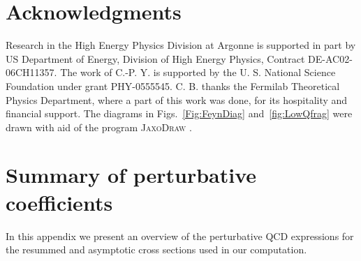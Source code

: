 \documentclass[12pt,english,aps,preprint,prd,letterpaper,fleqn,nofootinbib,showpacs,showkeys,tightenlines,floatfix]{revtex4}
\begin{document}
{\section*{Acknowledgments}

Research in the High Energy Physics Division at Argonne is supported
in part by US Department of Energy, Division of High Energy Physics,
Contract DE-AC02-06CH11357. The work of C.-P. Y. is supported by the
U. S. National Science Foundation under grant PHY-0555545. C. B. thanks
the Fermilab Theoretical Physics Department, where a part of this
work was done, for its hospitality and financial support. The diagrams 
in Figs.~\ref{Fig:FeynDiag} and~\ref{fig:LowQfrag} were drawn with 
aid of the program \textsc{JaxoDraw}
\cite{Binosi:2003yf}.


\appendix




\section{Summary of perturbative coefficients \label{Appendix:Summary}}

In this appendix we present an overview of the perturbative QCD expressions
for the resummed and asymptotic cross sections used in our computation.

}
\end{document}
